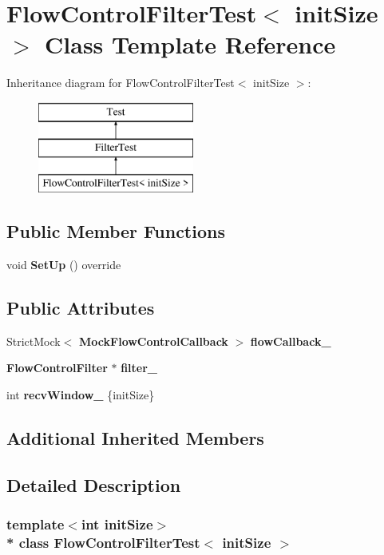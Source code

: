 \section{Flow\+Control\+Filter\+Test$<$ init\+Size $>$ Class Template Reference}
\label{classFlowControlFilterTest}
Inheritance diagram for Flow\+Control\+Filter\+Test$<$ init\+Size $>$\+:\begin{figure}[H]
\begin{center}
\leavevmode
\includegraphics[height=3.000000cm]{classFlowControlFilterTest}
\end{center}
\end{figure}
\subsection*{Public Member Functions}
\begin{DoxyCompactItemize}
\item 
void {\bf Set\+Up} () override
\end{DoxyCompactItemize}
\subsection*{Public Attributes}
\begin{DoxyCompactItemize}
\item 
Strict\+Mock$<$ {\bf Mock\+Flow\+Control\+Callback} $>$ {\bf flow\+Callback\+\_\+}
\item 
{\bf Flow\+Control\+Filter} $\ast$ {\bf filter\+\_\+}
\item 
int {\bf recv\+Window\+\_\+} \{init\+Size\}
\end{DoxyCompactItemize}
\subsection*{Additional Inherited Members}


\subsection{Detailed Description}
\subsubsection*{template$<$int init\+Size$>$\\*
class Flow\+Control\+Filter\+Test$<$ init\+Size $>$}



